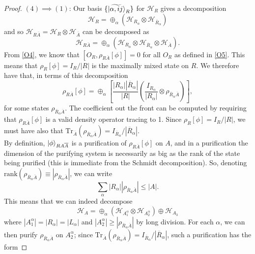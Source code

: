 \documentclass[12pt,a4paper]{report}
\numberwithin{equation}{section}
\newcommand{\ol}[1]{\overline{#1}}
\newcommand{\tr}{\text{Tr}}
\theoremstyle{definition}
\theoremstyle{theorem}
\theoremstyle{theorem}
\theoremstyle{example}
\theoremstyle{definition}
\begin{document}
\begin{proof}
	$(4)\implies (1)$: Our basis $\{\ket{\widetilde{\alpha,ij}}_{R}\}$ for $\mathcal{H}_{R}$ gives a decomposition
	\begin{equation}
		\mathcal{H}_{R}=\oplus_{\alpha}(\mathcal{H}_{R_{\alpha}}\otimes\mathcal{H}_{\ol{R}_{\alpha}})
	\end{equation}
	and so $\mathcal{H}_{R\ol{A}}=\mathcal{H}_{R}\otimes\mathcal{H}_{\ol{A}}$ can be decomposed as
	\begin{equation}
		\mathcal{H}_{R\ol{A}}=\oplus_{\alpha}(\mathcal{H}_{R_{\alpha}}\otimes\mathcal{H}_{\ol{R}_{\alpha}}\otimes\mathcal{H}_{\ol{A}}).
	\end{equation}
	From \ref{O4}, we know that $[O_{R},\rho_{R\ol{A}}[\phi]]=0$ for all $O_{R}$ as defined in \ref{O5}. This means that $\rho_{R}[\phi]=I_{R}/|R|$ is the maximally mixed state on $R$. We therefore have that, in terms of this decomposition
	\begin{equation}
		\rho_{R\ol{A}}[\phi]=\oplus_{\alpha}\left[\frac{|R_{\alpha}||\ol{R}_{\alpha}|}{|R|}\left(\frac{I_{R_{\alpha}}}{|R_{\alpha}|}\otimes\rho_{\ol{R}_{\alpha}\ol{A}}\right)\right],
	\end{equation}
	for some states $\rho_{\ol{R}_{\alpha}\ol{A}}$. The coefficient out the front can be computed by requiring that $\rho_{R\ol{A}}[\phi]$ is a valid density operator tracing to 1. Since $\rho_{R}[\phi]=I_{R}/|R|$, we must have also that $\tr_{\ol{A}}(\rho_{\ol{R}_{\alpha}\ol{A}})=I_{\ol{R}_{\alpha}}/|\ol{R}_{\alpha}|$.\\
	By definition, $\ket{\phi}_{RA\ol{A}}$ is a purification of $\rho_{R\ol{A}}[\phi]$ on $A$, and in a purification the dimension of the purifying system is necessarily as big as the rank of the state being purified (this is immediate from the Schmidt decomposition). So, denoting $\text{rank}(\rho_{\ol{R}_{\alpha}\ol{A}})\equiv|\rho_{\ol{R}_{\alpha}\ol{A}}|$, we can write
	\begin{equation}
		\sum_{\alpha}|R_{\alpha}||\rho_{\ol{R}_{\alpha}\ol{A}}|\leq|A|.
	\end{equation}
	This means that we can indeed decompose
	\begin{equation}
		\mathcal{H}_{A}=\oplus_{\alpha}(\mathcal{H}_{A_{1}^{\alpha}}\otimes\mathcal{H}_{A_{2}^{\alpha}})\oplus\mathcal{H}_{A_{3}}
	\end{equation}
	where $|A_{1}^{\alpha}|=|R_{\alpha}|=|L_{\alpha}|$ and $|A_{2}^{\alpha}|\geq|\rho_{\ol{R}_{\alpha}\ol{A}}|$ by long division. For each $\alpha$, we can then purify $\rho_{\ol{R}_{\alpha}\ol{A}}$ on $A_{2}^{\alpha}$; since $\tr_{\ol{A}}(\rho_{\ol{R}_{\alpha}\ol{A}})=I_{\ol{R}_{\alpha}}/|\ol{R}_{\alpha}|$, such a purification has the form

\end{proof}
\end{document}
